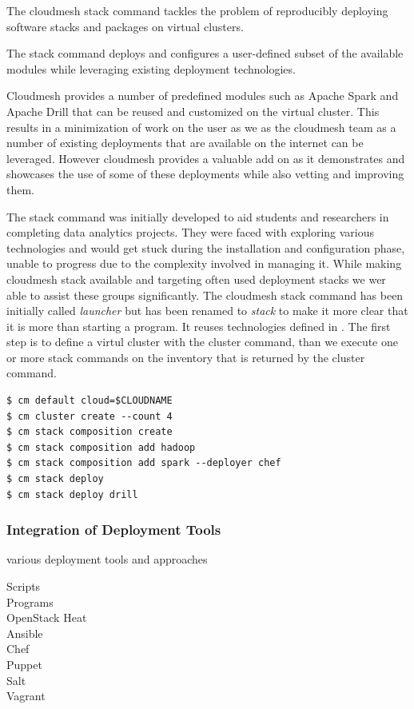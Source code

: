 The cloudmesh stack command tackles the problem of reproducibly
deploying software stacks and packages on virtual clusters.

The stack command deploys and configures a user-defined subset of the
available modules while leveraging existing deployment technologies.

Cloudmesh provides a number of predefined modules such as Apache Spark
and Apache Drill that can be reused and customized on the virtual
cluster. This results in a minimization of work on the user as we as
the cloudmesh team as a number of existing deployments that are
available on the internet can be leveraged. However cloudmesh provides
a valuable add on as it demonstrates and showcases the use of some of
these deployments while also vetting and improving them.


The stack command was initially developed to aid students and
researchers in completing data analytics projects.  They were faced
with exploring various technologies and would get stuck during the
installation and configuration phase, unable to progress due to the
complexity involved in managing it. While making cloudmesh stack
available and targeting often used deployment stacks we wer able to
assist these groups significantly.  The cloudmesh stack command has
been initially called {\em launcher} but has been renamed to {\em
  stack} to make it more clear that it is more than starting a
program. It reuses technologies defined in . The first step is
to define a virtul cluster with the cluster command, than we execute
one or more stack commands on the inventory that is returned by the
cluster command.

\begin{Verbatim}[fontfamily=helvetica]
$ cm default cloud=$CLOUDNAME
$ cm cluster create --count 4
$ cm stack composition create
$ cm stack composition add hadoop
$ cm stack composition add spark --deployer chef
$ cm stack deploy
$ cm stack deploy drill
\end{Verbatim}


\subsubsection{Integration of Deployment Tools}

various deployment tools and approaches

\begin{description}
\item[Scripts]
\item[Programs]
\item[OpenStack Heat]
\item[Ansible]
\item[Chef]
\item[Puppet]
\item[Salt]
\item[Vagrant]
\end{description}

